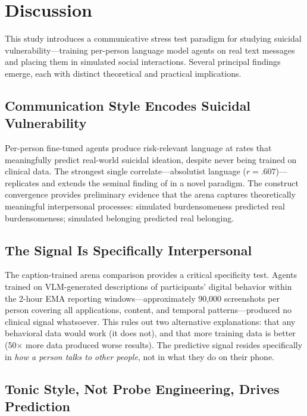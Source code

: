 \documentclass[review,12pt,authoryear]{elsarticle}
\begin{document}
\section{Discussion}

This study introduces a communicative stress test paradigm for studying suicidal vulnerability---training per-person language model agents on real text messages and placing them in simulated social interactions. Several principal findings emerge, each with distinct theoretical and practical implications.

\subsection{Communication Style Encodes Suicidal Vulnerability}

Per-person fine-tuned agents produce risk-relevant language at rates that meaningfully predict real-world suicidal ideation, despite never being trained on clinical data. The strongest single correlate---absolutist language ($r = .607$)---replicates and extends the seminal finding of \citet{almosaiwi2018absolute} in a novel paradigm. The construct convergence provides preliminary evidence that the arena captures theoretically meaningful interpersonal processes: simulated burdensomeness predicted real burdensomeness; simulated belonging predicted real belonging.

\subsection{The Signal Is Specifically Interpersonal}

The caption-trained arena comparison provides a critical specificity test. Agents trained on VLM-generated descriptions of participants' digital behavior within the 2-hour EMA reporting windows---approximately 90,000 screenshots per person covering all applications, content, and temporal patterns---produced no clinical signal whatsoever. This rules out two alternative explanations: that any behavioral data would work (it does not), and that more training data is better (50$\times$ more data produced worse results). The predictive signal resides specifically in \textit{how a person talks to other people}, not in what they do on their phone.

\subsection{Tonic Style, Not Probe Engineering, Drives Prediction}
\end{document}

